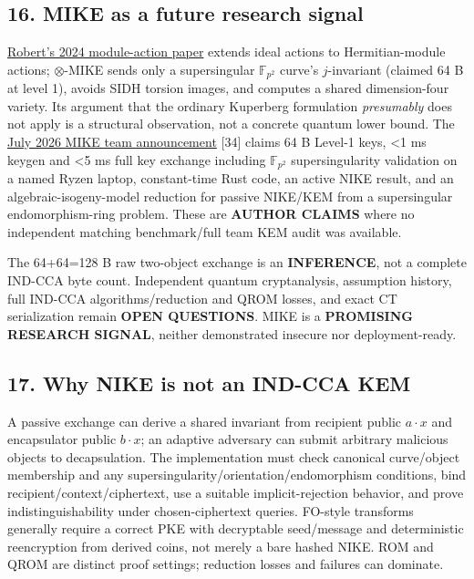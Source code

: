 \documentclass[
  10pt,
  a4paper,
]{article}
\begin{document}
\hypertarget{mike-as-a-future-research-signal}{%
\subsection{16. MIKE as a future research
signal}\label{mike-as-a-future-research-signal}}

\href{https://eprint.iacr.org/2024/1556}{Robert's 2024 module-action
paper} extends ideal actions to Hermitian-module actions;
\(\otimes\)-MIKE sends only a supersingular \(\mathbb F_{p^2}\) curve's
\(j\)-invariant (claimed 64 B at level 1), avoids SIDH torsion images,
and computes a shared dimension-four variety. Its argument that the
ordinary Kuperberg formulation \emph{presumably} does not apply is a
structural observation, not a concrete quantum lower bound. The
\href{https://mailarchive.ietf.org/arch/msg/cfrg/QM3t6di1bsgla6iIJ3gN6BbDoVk/}{July
2026 MIKE team announcement} {[}34{]} claims 64 B Level-1 keys,
\textless1 ms keygen and \textless5 ms full key exchange including
\(\mathbb F_{p^2}\) supersingularity validation on a named Ryzen laptop,
constant-time Rust code, an active NIKE result, and an
algebraic-isogeny-model reduction for passive NIKE/KEM from a
supersingular endomorphism-ring problem. These are \textbf{AUTHOR
CLAIMS} where no independent matching benchmark/full team KEM audit was
available.

The 64+64=128 B raw two-object exchange is an \textbf{INFERENCE}, not a
complete IND-CCA byte count. Independent quantum cryptanalysis,
assumption history, full IND-CCA algorithms/reduction and QROM losses,
and exact CT serialization remain \textbf{OPEN QUESTIONS}. MIKE is a
\textbf{PROMISING RESEARCH SIGNAL}, neither demonstrated insecure nor
deployment-ready.

\hypertarget{why-nike-is-not-an-ind-cca-kem}{%
\subsection{17. Why NIKE is not an IND-CCA
KEM}\label{why-nike-is-not-an-ind-cca-kem}}

A passive exchange can derive a shared invariant from recipient public
\(a\cdot x\) and encapsulator public \(b\cdot x\); an adaptive adversary
can submit arbitrary malicious objects to decapsulation. The
implementation must check canonical curve/object membership and any
supersingularity/orientation/endomorphism conditions, bind
recipient/context/ciphertext, use a suitable implicit-rejection
behavior, and prove indistinguishability under chosen-ciphertext
queries. FO-style transforms generally require a correct PKE with
decryptable seed/message and deterministic reencryption from derived
coins, not merely a bare hashed NIKE. ROM and QROM are distinct proof
settings; reduction losses and failures can dominate.
\end{document}
